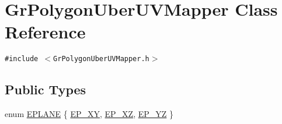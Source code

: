 \hypertarget{class_gr_polygon_uber_u_v_mapper}{
\section{GrPolygonUberUVMapper Class Reference}
\label{class_gr_polygon_uber_u_v_mapper}
}
{\tt \#include $<$GrPolygonUberUVMapper.h$>$}

\subsection*{Public Types}
\begin{CompactItemize}
\item 
enum \hyperlink{class_gr_polygon_uber_u_v_mapper_a69a4db116a89f2e1d789954220ee4ac}{EPLANE} \{ \hyperlink{class_gr_polygon_uber_u_v_mapper_a69a4db116a89f2e1d789954220ee4ac1161d6c0a1b5de467129eac750cb6d24}{EP\_\-XY}, 
\hyperlink{class_gr_polygon_uber_u_v_mapper_a69a4db116a89f2e1d789954220ee4ac4c6ad56dcb36d9b886f74b17edfe0fc6}{EP\_\-XZ}, 
\hyperlink{class_gr_polygon_uber_u_v_mapper_a69a4db116a89f2e1d789954220ee4ac40025b3183b072e100d713063f3bdec1}{EP\_\-YZ}
 \}

\end{CompactItemize}
